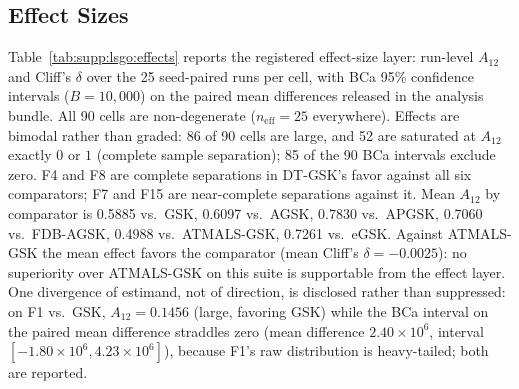 \documentclass[algorithms,article,submit,moreauthors,pdftex]{Definitions/mdpi}
\newcommand{\dtgsk}{DT-GSK}
\newcommand{\atmals}{ATMALS-GSK}
\begin{document}
\subsection{Effect Sizes}\label{sec:supp:lsgo:effects}

Table~\ref{tab:supp:lsgo:effects} reports the registered effect-size
layer: run-level $A_{12}$ and Cliff's $\delta$ over the 25 seed-paired
runs per cell, with BCa 95\% confidence intervals ($B = 10{,}000$) on
the paired mean differences released in the analysis bundle.  All 90
cells are non-degenerate ($n_{\mathrm{eff}} = 25$ everywhere).  Effects
are bimodal rather than graded: 86 of 90 cells are large, and 52 are
saturated at $A_{12}$ exactly $0$ or $1$ (complete sample separation);
85 of the 90 BCa intervals exclude zero.  F4 and F8 are complete
separations in \dtgsk{}'s favor against all six comparators; F7 and F15
are near-complete separations against it.  Mean $A_{12}$ by comparator is
0.5885 vs.\ GSK, 0.6097 vs.\ AGSK, 0.7830 vs.\ APGSK, 0.7060 vs.\ FDB-AGSK, 0.4988 vs.\ ATMALS-GSK, 0.7261 vs.\ eGSK.
Against \atmals{} the mean effect favors the comparator (mean Cliff's
$\delta = -0.0025$): no superiority over \atmals{} on this suite is
supportable from the effect layer.  One divergence of estimand, not of
direction, is disclosed rather than suppressed: on F1 vs.\ GSK,
$A_{12} = 0.1456$ (large, favoring GSK) while the BCa interval on the
paired mean difference straddles zero (mean difference $2.40 \times 10^{6}$,
interval $[-1.80 \times 10^{6}, 4.23 \times 10^{6}]$), because F1's raw
distribution is heavy-tailed; both are reported.
\end{document}

